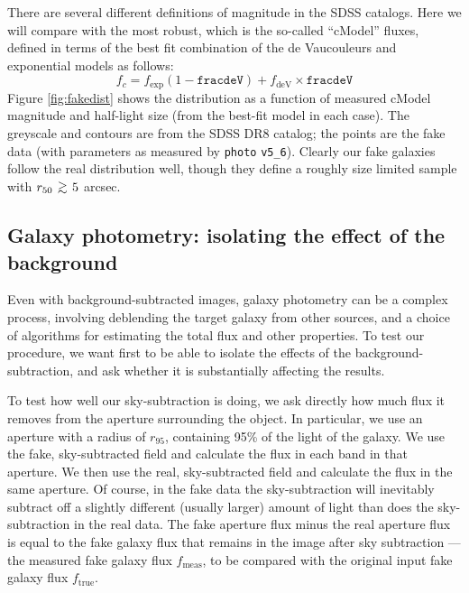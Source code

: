 \documentclass[10pt,preprint]{aastex}
\def\simgreat{\mathbin{\lower 3pt\hbox
    {$\,\rlap{\raise 5pt\hbox{$\char'076$}}\mathchar"7218\,$}}} %
\begin{document}
There are several different definitions of magnitude in the SDSS
catalogs. Here we will compare with the most robust, which is the
so-called ``cModel'' fluxes, defined in terms of the best fit
combination of the de Vaucouleurs and exponential models as follows:
\begin{equation}
 f_c = f_{\mathrm{exp}} \left(1-\mathtt{fracdeV}\right) +
 f_{\mathrm{deV}}
 \times \mathtt{fracdeV}
\end{equation}
Figure \ref{fig:fakedist} shows the distribution as a function of
measured cModel magnitude and half-light size (from the best-fit model
in each case). The greyscale and contours are from the SDSS DR8
catalog; the points are the fake data (with parameters as measured by
{\tt photo} {\tt v5\_6}). Clearly our fake galaxies follow the real
distribution well, though they define a roughly size limited sample
with $r_{50} \simgreat 5$ arcsec.

\subsection{Galaxy photometry: isolating the effect of the background}
\label{sec:simplegal}

Even with background-subtracted images, galaxy photometry can be a
complex process, involving deblending the target galaxy from other
sources, and a choice of algorithms for estimating the total flux and
other properties.  To test our procedure, we want first to be able to
isolate the effects of the background-subtraction, and ask whether it
is substantially affecting the results.

To test how well our sky-subtraction is doing, we ask directly how
much flux it removes from the aperture surrounding the object. In
particular, we use an aperture with a radius of $r_{95}$, containing
95\% of the light of the galaxy.  We use the fake, sky-subtracted
field and calculate the flux in each band in that aperture.  We then
use the real, sky-subtracted field and calculate the flux in the same
aperture.  Of course, in the fake data the sky-subtraction will
inevitably subtract off a slightly different (usually larger) amount
of light than does the sky-subtraction in the real data. The fake
aperture flux minus the real aperture flux is equal to the fake galaxy
flux that remains in the image after sky subtraction --- the measured
fake galaxy flux $f_{\mathrm{meas}}$, to be compared with the original
input fake galaxy flux $f_{\mathrm{true}}$.
\end{document}
